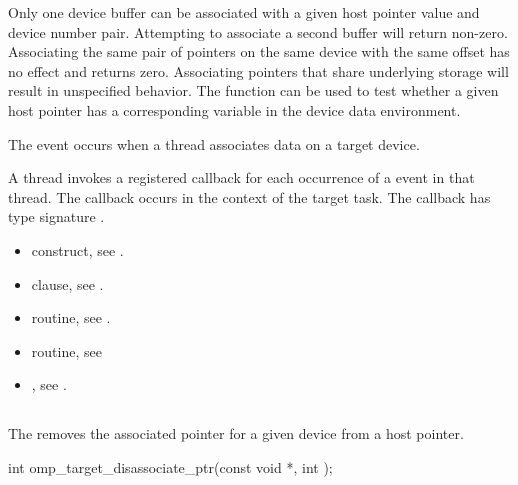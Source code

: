 \begin{ccppspecific}
Only one device buffer can be associated with a given host pointer value and
device number pair. Attempting to associate a second buffer will return
non-zero. Associating the same pair of pointers on the same device with the
same offset has no effect and returns zero.  Associating pointers that share
underlying storage will result in unspecified behavior. The
 function can be used to test whether a given
host pointer has a corresponding variable in the device data environment.

\events
The  event occurs when a thread associates 
data on a target device.

\tools
A thread invokes a registered 
callback for each occurrence of a  event in 
that thread. The callback occurs in the context of the target task.  
The callback has type signature .

\crossreferences
\begin{itemize}
\item {} construct, see .

\item {} clause, see .

\item {} routine, see .

\item {} routine, see

\item {}, see
.
\end{itemize}



\subsection{}
\label{subsec:omp_target_disassociate_ptr}
\summary

The  removes the associated pointer for a
given device from a host pointer.

\format
\begin{ompcFunction}
int omp_target_disassociate_ptr(const void *, int );
\end{ompcFunction}


\end{ccppspecific}
